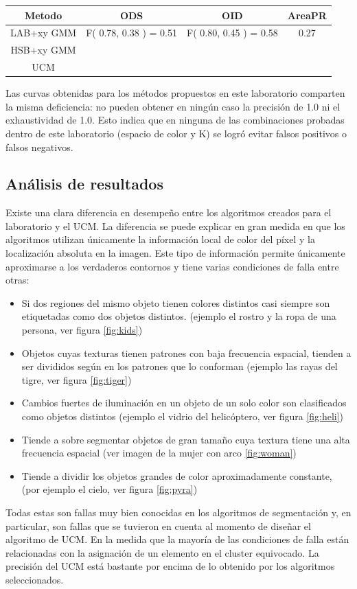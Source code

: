 \documentclass[10pt,twocolumn,letterpaper]{article}
\begin{document}
\begin{table}[t]
\centering
\begin{tabular}{c | c | c | c }
 Metodo & ODS & OID & AreaPR  \\
 \hline	
 LAB+xy GMM & F( 0.78, 0.38 ) = 0.51  & F( 0.80, 0.45 ) = 0.58 & 0.27 \\
 HSB+xy GMM &  &  &  \\
 UCM &  &  &  \\
\end{tabular}
\label{table:thetable}
\end{table}


Las curvas obtenidas para los métodos propuestos en este laboratorio comparten la misma deficiencia:  no pueden obtener en ningún caso la precisión de 1.0 ni el exhaustividad de 1.0. Esto indica que en ninguna de las combinaciones probadas dentro de este laboratorio (espacio de color y K) se logró evitar falsos positivos o falsos negativos.


\subsection{Análisis de resultados}

Existe una clara diferencia en desempeño entre los algoritmos creados para el laboratorio y el UCM. La diferencia se puede explicar en gran medida en que los algoritmos utilizan únicamente la información local de color del píxel y la localización absoluta en la imagen. Este tipo de información permite únicamente aproximarse a los verdaderos contornos y tiene varias condiciones de falla entre otras:

\begin{itemize}
\item Si dos regiones del mismo objeto tienen  colores distintos casi siempre son etiquetadas como dos objetos distintos. (ejemplo el rostro y la ropa de una persona, ver figura \ref{fig:kids})
\item  Objetos cuyas texturas tienen patrones con baja frecuencia espacial, tienden a ser divididos según en los patrones que lo conforman (ejemplo las rayas del tigre, ver figura \ref{fig:tiger})
\item Cambios fuertes de iluminación en un objeto de un solo color son clasificados como objetos distintos  (ejemplo el vidrio del helicóptero, ver figura \ref{fig:heli})
\item Tiende a sobre segmentar objetos de gran tamaño cuya textura tiene una alta frecuencia espacial (ver imagen de la mujer con arco \ref{fig:woman})
\item Tiende a dividir los objetos grandes de color aproximadamente constante, (por ejemplo el cielo, ver figura \ref{fig:pyra})

\end{itemize}
Todas estas son fallas muy bien conocidas en los algoritmos de segmentación y, en particular, son fallas que se tuvieron en cuenta al momento de diseñar el algoritmo de UCM.
En la medida que la mayoría de las condiciones de falla están relacionadas con la asignación de un elemento en el cluster equivocado. La precisión del UCM está bastante por encima de lo obtenido por los algoritmos seleccionados.
\end{document}
